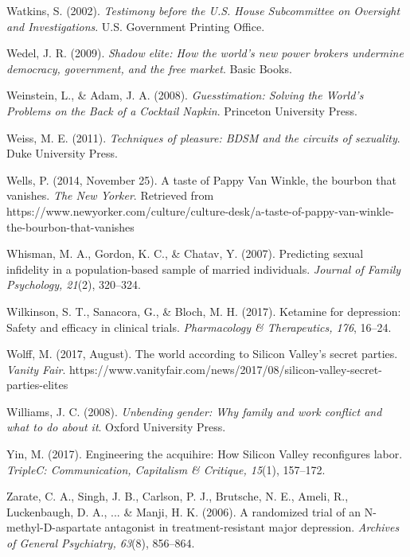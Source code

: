 \begin{thebibliography}{}
    
    Watkins, S. (2002). \textit{Testimony before the U.S. House Subcommittee on Oversight and Investigations}. U.S. Government Printing Office.

    Wedel, J. R. (2009). \textit{Shadow elite: How the world's new power brokers undermine democracy, government, and the free market}. Basic Books.

    Weinstein, L., \& Adam, J. A. (2008). \textit{Guesstimation: Solving the World's Problems on the Back of a Cocktail Napkin}. Princeton University Press.

    Weiss, M. E. (2011). \textit{Techniques of pleasure: BDSM and the circuits of sexuality}. Duke University Press.

    Wells, P. (2014, November 25). A taste of Pappy Van Winkle, the bourbon that vanishes. \textit{The New Yorker}. Retrieved from https://www.newyorker.com/culture/culture-desk/a-taste-of-pappy-van-winkle-the-bourbon-that-vanishes

    Whisman, M. A., Gordon, K. C., \& Chatav, Y. (2007). Predicting sexual infidelity in a population-based sample of married individuals. \textit{Journal of Family Psychology, 21}(2), 320–324.

    Wilkinson, S. T., Sanacora, G., \& Bloch, M. H. (2017). Ketamine for depression: Safety and efficacy in clinical trials. \textit{Pharmacology \& Therapeutics, 176}, 16–24.

    Wolff, M. (2017, August). The world according to Silicon Valley’s secret parties. \textit{Vanity Fair}. https://www.vanityfair.com/news/2017/08/silicon-valley-secret-parties-elites
    
    Williams, J. C. (2008). \textit{Unbending gender: Why family and work conflict and what to do about it}. Oxford University Press.



    Yin, M. (2017). Engineering the acquihire: How Silicon Valley reconfigures labor. \textit{TripleC: Communication, Capitalism \& Critique, 15}(1), 157–172.


    Zarate, C. A., Singh, J. B., Carlson, P. J., Brutsche, N. E., Ameli, R., Luckenbaugh, D. A., ... \& Manji, H. K. (2006). A randomized trial of an N-methyl-D-aspartate antagonist in treatment-resistant major depression. \textit{Archives of General Psychiatry, 63}(8), 856–864.


\end{thebibliography}
